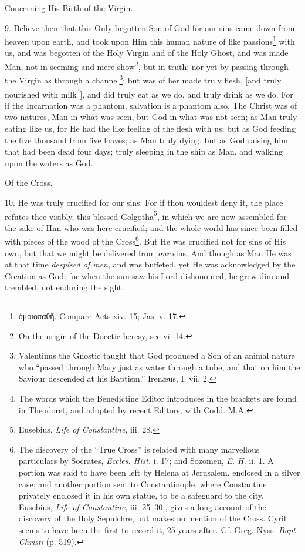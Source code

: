Concerning His Birth of the Virgin.

9. Believe then that this Only-begotten Son of God for our sins came down from heaven upon earth, and took upon Him this human nature of like passions\footnote{\textgreek{ὁμοιοπαθῆ}. Compare Acts xiv. 15; Jas. v. 17.} with us, and was begotten of the Holy Virgin and of the Holy Ghost, and was made Man, not in seeming and mere show\footnote{On the origin of the Docetic heresy, see vi. 14.}, but in truth; nor yet by passing through the Virgin as through a channel\footnote{Valentinus the Gnostic taught that God produced a Son of an animal nature who “passed through Mary just as water through a tube, and that on him the Saviour descended at his Baptism.” Irenæus, I. vii. 2.}; but was of her made truly flesh, [and truly nourished with milk\footnote{The words which the Benedictine Editor introduces in the brackets are found in Theodoret, and adopted by recent Editors, with Codd. M.A.}], and did truly eat as we do, and truly drink as we do. For if the Incarnation was a phantom, salvation is a phantom also. The Christ was of two natures, Man in what was seen, but God in what was not seen; as Man truly eating like us, for He had the like feeling of the flesh with us; but as God feeding the five thousand from five loaves; as Man truly dying, but as God raising him that had been dead four days; truly sleeping in the ship as Man, and walking upon the waters as God.

Of the Cross.

10. He was truly crucified for our sins. For if thou wouldest deny it, the place refutes thee visibly, this blessed Golgotha\footnote{Eusebius, \emph{Life of Constantine}, iii. 28.}, in which we are now assembled for the sake of Him who was here crucified; and the whole world has since been filled with pieces of the wood of the Cross\footnote{The discovery of the “True Cross” is related with many marvellous particulars by Socrates, \emph{Eccles. Hist.} i. 17; and Sozomen, \emph{E. H.} ii. 1. A portion was said to have been left by Helena at Jerusalem, enclosed in a silver case; and another portion sent to Constantinople, where Constantine privately enclosed it in his own statue, to be a safeguard to the city. Eusebius, \emph{Life of Constantine}, iii. 25–30 , gives a long account of the discovery of the Holy Sepulchre, but makes no mention of the Cross. Cyril seems to have been the first to record it, 25 years after. Cf. Greg. Nyss. \emph{Bapt. Christi} (p. 519).}. But He was crucified not for sins of His own, but that we might be delivered from \emph{our} sins. And though as Man He was at that time \emph{despised of men}, and was buffeted, yet He was acknowledged by the Creation as God: for when the sun saw his Lord dishonoured, he grew dim and trembled, not enduring the sight.

